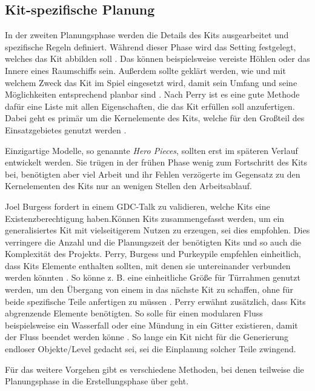 \subsection{Kit-spezifische Planung}\label{Kit Spezifische Planung}
In der zweiten Planungsphase werden die Details des Kits ausgearbeitet und spezifische Regeln definiert. Während dieser Phase wird das Setting festgelegt, welches das Kit abbilden soll \parencite{Burgess}. Das können beispielsweise vereiste Höhlen oder das Innere eines Raumschiffs sein. Außerdem sollte geklärt werden, wie und mit welchem Zweck das Kit im Spiel eingesetzt wird, damit sein Umfang und seine Möglichkeiten entsprechend planbar sind \parencite{Burgess}. Nach Perry ist es eine gute Methode dafür eine Liste mit allen Eigenschaften, die das Kit erfüllen soll anzufertigen. Dabei geht es primär um die Kernelemente des Kits, welche für den Großteil des Einsatzgebietes genutzt werden \parencite{Perry}.
\par
Einzigartige Modelle, so genannte \textit{Hero Pieces}, sollten erst im späteren Verlauf entwickelt werden. Sie trügen in der frühen Phase wenig zum Fortschritt des Kits bei, benötigten aber viel Arbeit und ihr Fehlen verzögerte im Gegensatz zu den Kernelementen des Kits nur an wenigen Stellen den Arbeitsablauf. \parencite{Burgess}
\par\enlargethispage{30pt}
Joel Burgess fordert in einem GDC-Talk zu validieren, welche Kits eine Existenzberechtigung haben.Können Kits zusammengefasst werden, um ein generalisiertes Kit mit vielseitigerem Nutzen zu erzeugen, sei dies empfohlen. Dies verringere die Anzahl und die Planungszeit der benötigten Kits und so auch die Komplexität des Projekts. \parencite{Fallout4}
\newpage
Perry, Burgess und Purkeypile empfehlen einheitlich, dass Kits Elemente enthalten sollten, mit denen sie untereinander verbunden werden könnten \parencite{Burgess,Perry}. So könne z. B. eine einheitliche Größe für Türrahmen genutzt werden, um den Übergang von einem in das nächste Kit zu schaffen, ohne für beide spezifische Teile anfertigen zu müssen \parencite{Burgess}.
Perry erwähnt zusätzlich, dass Kits abgrenzende Elemente benötigten. So solle für einen modularen Fluss beispielsweise ein Wasserfall oder eine Mündung in ein Gitter existieren, damit der Fluss beendet werden könne \parencite{Perry}. So lange ein Kit nicht für die Generierung endloser Objekte/Level gedacht sei, sei die Einplanung solcher Teile zwingend.
\par
Für das weitere Vorgehen gibt es verschiedene Methoden, bei denen teilweise die Planungsphase in die Erstellungsphase über geht.
